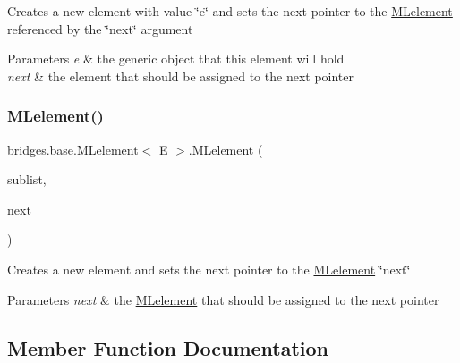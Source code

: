 Creates a new element with value \char`\"{}e\char`\"{} and sets the next pointer to the \hyperlink{classbridges_1_1base_1_1_m_lelement}{M\+Lelement} referenced by the \char`\"{}next\char`\"{} argument


\begin{DoxyParams}{Parameters}
{\em e} & the generic object that this element will hold \\
\hline
{\em next} & the element that should be assigned to the next pointer \\
\hline
\end{DoxyParams}
\mbox{\label{classbridges_1_1base_1_1_m_lelement_aa660281523a7de140a0b17737096a332}} 
\subsubsection{\texorpdfstring{M\+Lelement()}{MLelement()}\hspace{0.1cm}{\footnotesize\ttfamily [4/4]}}
{\footnotesize\ttfamily \hyperlink{classbridges_1_1base_1_1_m_lelement}{bridges.\+base.\+M\+Lelement}$<$ E $>$.\hyperlink{classbridges_1_1base_1_1_m_lelement}{M\+Lelement} (\begin{DoxyParamCaption}\item[{\hyperlink{classbridges_1_1base_1_1_m_lelement}{M\+Lelement}$<$ E $>$}]{sublist,  }\item[{\hyperlink{classbridges_1_1base_1_1_m_lelement}{M\+Lelement}$<$ E $>$}]{next }\end{DoxyParamCaption})}

Creates a new element and sets the next pointer to the \hyperlink{classbridges_1_1base_1_1_m_lelement}{M\+Lelement} \char`\"{}next\char`\"{} 
\begin{DoxyParams}{Parameters}
{\em next} & the \hyperlink{classbridges_1_1base_1_1_m_lelement}{M\+Lelement} that should be assigned to the next pointer \\
\hline
\end{DoxyParams}


\subsection{Member Function Documentation}
\mbox{\label{classbridges_1_1base_1_1_m_lelement_aa2e26697e2c70a36b8345a324d00679a}} 
